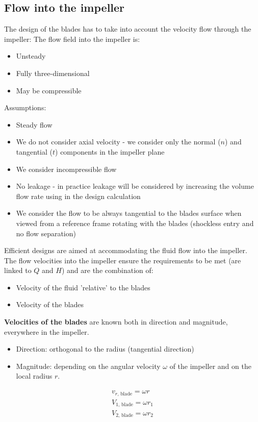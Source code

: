 \documentclass[class=report, crop=false, 12pt,a4paper]{standalone}
\begin{document}
\subsection{Flow into the impeller}
The design of the blades has  to take into account the velocity flow through the impeller: The flow field into the impeller is:
\begin{itemize}
  \item Unsteady
  \item Fully three-dimensional
  \item May be compressible
\end{itemize}
Assumptions:
\begin{itemize}
  \item Steady flow
  \item We do not consider axial velocity - we consider only the normal ($n$) and tangential ($t$) components in the impeller plane
  \item We consider incompressible flow
  \item No leakage - in practice leakage will be considered by increasing the volume flow rate using in the design calculation
  \item We consider the flow to be always tangential to the blades surface when viewed from a reference frame rotating with the blades (shockless entry and no flow separation)
\end{itemize}
Efficient designs are aimed at accommodating the fluid flow into the impeller. The flow velocities into the impeller ensure the requirements to be met (are linked to $Q$ and $H$) and are the combination of:
\begin{itemize}
  \item Velocity of the fluid 'relative' to the blades
  \item Velocity of the blades
\end{itemize}
\textbf{Velocities of the blades} are known both in direction and magnitude, everywhere in the impeller.
\begin{itemize}
  \item Direction: orthogonal to the radius (tangential direction)
  \item Magnitude: depending on the angular velocity $\omega$ of the impeller and on the local radius $r$.
\end{itemize}
\begin{gather}
  v_{r \textrm{, blade}} = \omega r\\
  V_{1 \textrm{, blade}} = \omega r_1\\
  V_{2 \textrm{, blade}} = \omega r_2\\
\end{gather}
\end{document}
